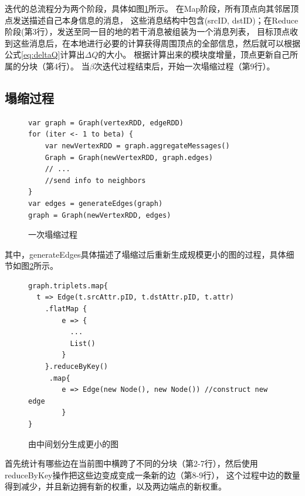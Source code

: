 \documentclass[master]{njuthesis}
\begin{document}
迭代的总流程分为两个阶段，具体如图\ref{fig:coarse}所示。
在Map阶段，所有顶点向其邻居顶点发送描述自己本身信息的消息，
这些消息结构中包含(srcID, dstID)；在Reduce阶段(第3行），发送至同一目的地的若干消息被组装为一个消息列表，
目标顶点收到这些消息后，在本地进行必要的计算获得周围顶点的全部信息，然后就可以根据公式\ref{eq:deltaQ}计算出$\Delta Q$的大小。
根据计算出来的模块度增量，顶点更新自己所属的分块（第4行）。
当$\beta$次迭代过程结束后，开始一次塌缩过程（第9行）。
\subsection{塌缩过程}
\begin{figure}[h]
  \centering
\begin{lstlisting}
var graph = Graph(vertexRDD, edgeRDD)
for (iter <- 1 to beta) {
    var newVertexRDD = graph.aggregateMessages()
    Graph = Graph(newVertexRDD, graph.edges)
    // ...
    //send info to neighbors  
}
var edges = generateEdges(graph)
graph = Graph(newVertexRDD, edges)
\end{lstlisting}
\caption{一次塌缩过程}
   \label{fig:coarse}
\end{figure}
其中，generateEdges具体描述了塌缩过后重新生成规模更小的图的过程，具体细节如图\ref{fig:smaller_graph}所示。
\begin{figure}[h]
  \centering
\begin{lstlisting}
graph.triplets.map{
  t => Edge(t.srcAttr.pID, t.dstAttr.pID, t.attr)
	.flatMap {
	    e => {
	      ...
	      List()
	    }
	}.reduceByKey()
	 .map{
	    e => Edge(new Node(), new Node()) //construct new edge
	    }
}
\end{lstlisting}
\caption{由中间划分生成更小的图}
   \label{fig:smaller_graph}
\end{figure}
首先统计有哪些边在当前图中横跨了不同的分块（第2-7行），然后使用reduceByKey操作把这些边变成变成一条新的边（第8-9行），
这个过程中边的数量得到减少，并且新边拥有新的权重，以及两边端点的新权重。
\end{document}
